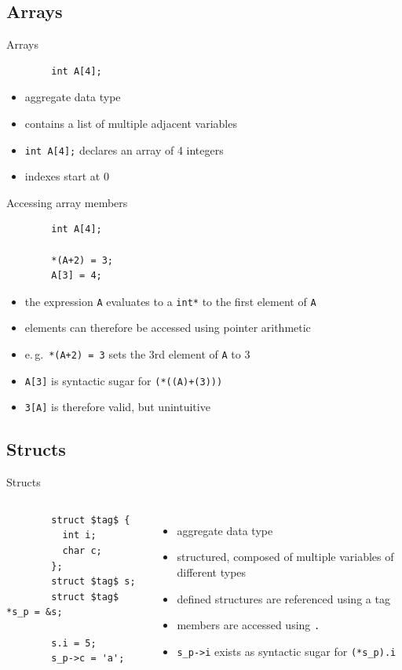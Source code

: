 \documentclass[english,compress]{beamer}
\begin{document}
\subsection{Arrays}
\begin{frame}[fragile]{Arrays}
	\begin{lstlisting}
		int A[4];
	\end{lstlisting}
	\begin{itemize}
		\item aggregate data type
		\item contains a list of multiple adjacent variables
		\item \lstinline|int A[4];| declares an array of 4 integers
		\item indexes start at 0
	\end{itemize}
\end{frame}

\begin{frame}[fragile]{Accessing array members}
	\begin{lstlisting}
		int A[4];

		*(A+2) = 3;
		A[3] = 4;
	\end{lstlisting}
	\begin{itemize}
		\item the expression \lstinline|A| evaluates to a \lstinline|int*| to the first element of \lstinline|A|
		\item elements can therefore be accessed using pointer arithmetic
		\item e.\,g.\ \lstinline|*(A+2) = 3| sets the 3rd element of \lstinline|A| to 3
		\item \lstinline|A[3]| is syntactic sugar for \lstinline|(*((A)+(3)))|
		\item \lstinline|3[A]| is therefore valid, but unintuitive
	\end{itemize}
\end{frame}

\subsection{Structs}
\begin{frame}[fragile]{Structs}
	\begin{columns}
	\begin{lstlisting}
		struct $tag$ {
		  int i;
		  char c;
		};
		struct $tag$ s;
		struct $tag$ *s_p = &s;

		s.i = 5;
		s_p->c = 'a';
	\end{lstlisting}
	\begin{itemize}
		\item aggregate data type
		\item structured, composed of multiple variables of different types
		\item defined structures are referenced using a tag
		\item members are accessed using \lstinline|.|
		\item \lstinline|s_p->i| exists as syntactic sugar for
			\lstinline|(*s_p).i|
	\end{itemize}
	\end{columns}
\end{frame}
\end{document}
